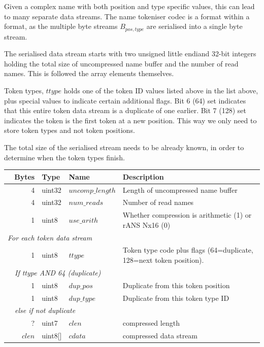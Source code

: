 \documentclass[a4paper]{article}
\begin{document}
Given a complex name with both position and type specific values, this
can lead to many separate data streams.  The name tokeniser codec is
a format within a format, as the multiple byte streams $B_{pos,type}$
are serialised into a single byte stream.

The serialised data stream starts with two unsigned little endiand 32-bit
integers holding the total size of uncompressed name buffer and the
number of read names.  This is followed the array elements
themselves.

Token types, $ttype$ holds one of the token ID values listed above
in the list above, plus special values to indicate certain additional
flags.  Bit 6 (64) set indicates that this entire token data stream is a
duplicate of one earlier.  Bit 7 (128) set indicates the token
is the first token at a new position.  This way we only need to store
token types and not token positions.

The total size of the serialised stream needs to be already known, in
order to determine when the token types finish.

\begin{tabular}{|r|r|r|l|l|p{10cm}|}
\hline
\multicolumn{3}{|r|}{\textbf{Bytes}} & \textbf{Type} & \textbf{Name} & \textbf{Description}\\
\hline
\multicolumn{3}{|r|}{4} & uint32 & $uncomp\_length$ & Length of uncompressed name buffer\\
\multicolumn{3}{|r|}{4} & uint32 & $num\_reads$ & Number of read names\\
\multicolumn{3}{|r|}{1} & uint8  & $use\_arith$ & Whether compression is arithmetic (1) or rANS Nx16 (0)\\
\hline
\multicolumn{6}{|l|}{\quad\textit{For each token data stream}}\\
\cline{2-6}
& \multicolumn{2}{r|}{1} & uint8 & $ttype$ & Token type code plus flags (64=duplicate, 128=next token position).\\
\cline{2-6}
& \multicolumn{5}{l|}{\textit{If ttype AND 64 (duplicate)}}\\
\cline{3-6}
& & 1 & uint8 & $dup\_pos$  & Duplicate from this token position\\
& & 1 & uint8 & $dup\_type$ & Duplicate from this token type ID\\
\cline{3-6}
& \multicolumn{5}{l|}{\textit{else if not duplicate}}\\
\cline{3-6}
& & ? & uint7 & $clen$ & compressed length\\
& & $clen$ & uint8[] & $cdata$ & compressed data stream\\
\hline
\end{tabular}
\end{document}

